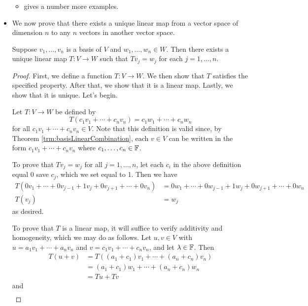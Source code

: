 \documentclass[../main.tex]{subfiles}
\begin{document}
\begin{itemize}
\begin{itemize}
        \item \textcite{bib:Axler} gives a number more examples.
    \end{itemize}
    \item We now prove that there exists a unique linear map from a vector space of dimension $n$ to any $n$ vectors in another vector space.
    \begin{theorem}
        Suppose $v_1,\dots,v_n$ is a basis of $V$ and $w_1,\dots,w_n\in W$. Then there exists a unique linear map $T:V\to W$ such that $Tv_j=w_j$ for each $j=1,\dots,n$.
        \begin{proof}
            First, we define a function $T:V\to W$. We then show that $T$ satisfies the specified property. After that, we show that it is a linear map. Lastly, we show that it is unique. Let's begin.\par
            Let $T:V\to W$ be defined by
            \begin{equation*}
                T(c_1v_1+\cdots+c_nv_n) = c_1w_1+\cdots+c_nw_n
            \end{equation*}
            for all $c_1v_1+\cdots+c_nv_n\in V$. Note that this definition is valid since, by Theorem \ref{trm:basisLinearCombination}, each $v\in V$ can be written in the form $c_1v_1+\cdots+c_nv_n$ where $c_1,\dots,c_n\in\mathbb{F}$.\par
            To prove that $Tv_j=w_j$ for all $j=1,\dots,n$, let each $c_i$ in the above definition equal 0 save $c_j$, which we set equal to 1. Then we have
            \begin{align*}
                T(0v_1+\cdots+0v_{j-1}+1v_j+0v_{j+1}+\cdots+0v_n) &= 0w_1+\cdots+0w_{j-1}+1w_j+0w_{j+1}+\cdots+0w_n\\
                T(v_j) &= w_j
            \end{align*}
            as desired.\par
            To prove that $T$ is a linear map, it will suffice to verify additivity and homogeneity, which we may do as follows. Let $u,v\in V$ with $u=a_1v_1+\cdots+a_nv_n$ and $v=c_1v_1+\cdots+c_nv_n$, and let $\lambda\in\mathbb{F}$. Then
            \begin{align*}
                T(u+v) &= T((a_1+c_1)v_1+\cdots+(a_n+c_n)v_n)\\
                &= (a_1+c_1)w_1+\cdots+(a_n+c_n)w_n\\
                &= Tu+Tv
            \end{align*}
            and
            \begin{align*}

\end{align*}
\end{proof}
\end{theorem}
\end{itemize}
\end{document}
